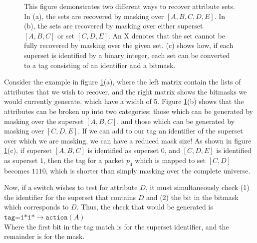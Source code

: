 \begin{figure}[t!]
\begin{minipage}{1\linewidth}
\begin{subfigure}[c]{0.96\linewidth}
\end{subfigure} 
\end{minipage} 
\caption{This figure demonstrates two different ways to recover attribute sets. In (a), the sets are recovered by masking over $[A,B,C,D,E]$. In (b), the sets are recovered by masking over either superset $[A,B,C]$ or set $[C,D,E]$. An X denotes that the set cannot be fully recovered by masking over the given set. (c) shows how, if each superset is identified by a binary integer, each set can be converted to a tag consisting of an identifier and a bitmask.}
\label{fig:masking}
\end{figure}

Consider the example in figure \ref{fig:masking}(a), where the left matrix contain the lists of attributes that we wish to recover, and the right matrix shows the bitmasks we would currently generate, which have a width of 5. Figure \ref{fig:masking}(b) shows that the attributes can be broken up into two categories: those which can be generated by masking over the superset $[A,B,C]$, and those which can be generated by masking over $[C,D,E]$. If we can add to our tag an identifier of the superset over which we are masking, we can have a reduced mask size! As shown in figure \ref{fig:masking}(c), if superset $[A,B,C]$ is identified as superset $0$, and $[C,D,E]$ is identified as superset $1$, then the tag for a packet $p_4$ which is mapped to set $[C,D]$ becomes $1110$, which is shorter than simply masking over the complete universe.

Now, if a switch wishes to test for attribute $D$, it must simultaneously check (1) the identifier for the superset that contains $D$ and (2) the bit in the bitmask which corresponds to $D$. Thus, the check that would be generated is\\
\noindent
{%
$\texttt{tag=1*1*} \rightarrow \texttt{action}(A)$\\
}
Where the first bit in the tag match is for the superset identifier, and the
remainder is for the mask.

